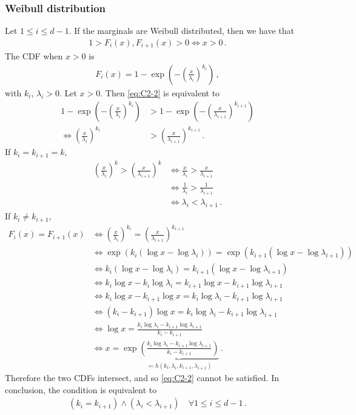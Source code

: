 \documentclass{article}
\begin{document}
\subsubsection*{Weibull distribution}
%
Let $1 \leq i \leq d - 1$. If the marginals are Weibull distributed,
then we have that
%
\begin{align*}
	1 > F_i(x), F_{i + 1}(x) > 0 \iff x > 0 \,.
\end{align*}
%
The CDF when $x > 0$ is
%
\begin{align*}
	F_i(x) = 1 - \exp\left(-\left(\frac{x}{\lambda_i}\right)
		^ {k_i}\right) \,,
\end{align*}
%
with $k_i$, $\lambda_i > 0$. Let $x > 0$.
Then \eqref{eq:C2-2} is equivalent to
%
\begin{align*}
	1 - \exp\left(-\left(\frac{x}{\lambda_i}\right)
		^ {k_i}\right) &> 1- \exp\left(-\left(\frac{x}{\lambda_{i + 1}}\right)
		^ {k_{i + 1}}\right)\\
	\iff \left(\frac{x}{\lambda_i}\right) ^ {k_i} &>
		\left(\frac{x}{\lambda_{i + 1}}\right) ^ {k_{i + 1}} \,.
\end{align*}
%
If $k_i = k_{i + 1} = k$,
%
\begin{align*}
	\left(\frac{x}{\lambda_i}\right) ^ k
		> \left(\frac{x}{\lambda_{i + 1}}\right) ^ k&
		\iff \frac{x}{\lambda_i} > \frac{x}{\lambda_{i + 1}}\\
	&\iff \frac{1}{\lambda_i} > \frac{1}{\lambda_{i + 1}}\\
	&\iff \lambda_i < \lambda_{i + 1} \,.
\end{align*}
%
If $k_i \neq k_{i + 1}$,
%
\begin{align*}
	F_i(x) =F_{i + 1}(x)
		&\iff \left(\frac{x}{\lambda_i}\right) ^ {k_i}
		= \left(\frac{x}{\lambda_{i + 1}}\right) ^ {k_{i + 1}}\\
	&\iff \exp\left(k_i (\log x - \log\lambda_i)\right)
		=\exp\left({k_{i + 1}}(\log x - \log\lambda_{i + 1})\right)\\
	&\iff k_i (\log x - \log\lambda_i)
		= {k_{i + 1}} (\log x - \log\lambda_{i + 1})\\
	&\iff k_i \log x - k_i \log\lambda_i 
		= {k_{i + 1}} \log x - {k_{i + 1}} \log\lambda_{i + 1}\\
	&\iff k_i \log x - {k_{i + 1}} \log x
		=k_i \log\lambda_i - {k_{i + 1}} \log\lambda_{i + 1}\\
	&\iff (k_i - {k_{i + 1}}) \log x 
		= k_i \log\lambda_i - {k_{i + 1}} \log\lambda_{i + 1}\\
	&\iff \log x
		= \frac{k_i \log\lambda_i - {k_{i + 1}}
		\log\lambda_{i + 1}}{k_i - {k_{i + 1}}}\\
	&\iff x
		= \exp\underbrace{\left(\frac{k_i \log\lambda_i - {k_{i + 1}}
		\log\lambda_{i + 1}}{k_i - {k_{i + 1}}}\right)}
		_{\eqqcolon h(k_i, \lambda_i, k_{i + 1}, \lambda_{i + 1})} \,.
\end{align*}
%
Therefore the two CDFs intersect, and so \eqref{eq:C2-2} cannot be satisfied.
In conclusion, the condition is equivalent to
%
\begin{align*}
	(k_i = k_{i + 1}) \land (\lambda_i < \lambda_{i + 1})
		\quad \forall 1 \leq i \leq d - 1 \,.
\end{align*}
%
\end{document}
